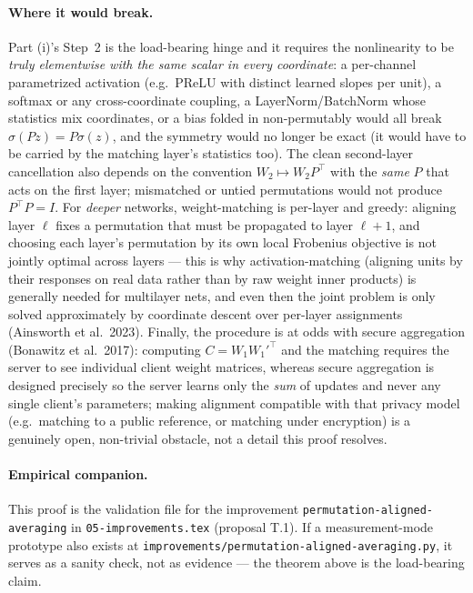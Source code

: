 \documentclass[11pt]{article}
\theoremstyle{definition}
\theoremstyle{remark}
\begin{document}
\paragraph{Where it would break.}
Part (i)'s Step~2 is the load-bearing hinge and it requires the nonlinearity to be \emph{truly
elementwise with the same scalar in every coordinate}: a per-channel parametrized activation (e.g.\
PReLU with distinct learned slopes per unit), a softmax or any cross-coordinate coupling, a
LayerNorm/BatchNorm whose statistics mix coordinates, or a bias folded in non-permutably would all
break $\sigma(Pz)=P\sigma(z)$, and the symmetry would no longer be exact (it would have to be carried
by the matching layer's statistics too). The clean second-layer cancellation also depends on the
convention $W_2\mapsto W_2 P^{\top}$ with the \emph{same} $P$ that acts on the first layer; mismatched
or untied permutations would not produce $P^{\top}P=I$. For \emph{deeper} networks, weight-matching
is per-layer and greedy: aligning layer $\ell$ fixes a permutation that must be propagated to layer
$\ell+1$, and choosing each layer's permutation by its own local Frobenius objective is not jointly
optimal across layers --- this is why activation-matching (aligning units by their responses on real
data rather than by raw weight inner products) is generally needed for multilayer nets, and even then
the joint problem is only solved approximately by coordinate descent over per-layer assignments
(Ainsworth et al.\ 2023). Finally, the procedure is at odds with secure aggregation
(Bonawitz et al.\ 2017): computing $C=W_1 W_1'^{\top}$ and the matching requires the server to see
individual client weight matrices, whereas secure aggregation is designed precisely so the server
learns only the \emph{sum} of updates and never any single client's parameters; making alignment
compatible with that privacy model (e.g.\ matching to a public reference, or matching under
encryption) is a genuinely open, non-trivial obstacle, not a detail this proof resolves.

\paragraph{Empirical companion.}
This proof is the validation file for the improvement \texttt{permutation-aligned-averaging} in
\texttt{05-improvements.tex} (proposal T.1). If a measurement-mode prototype also exists at
\texttt{improvements/permutation-aligned-averaging.py}, it serves as a sanity check, not as evidence
--- the theorem above is the load-bearing claim.
\end{document}
